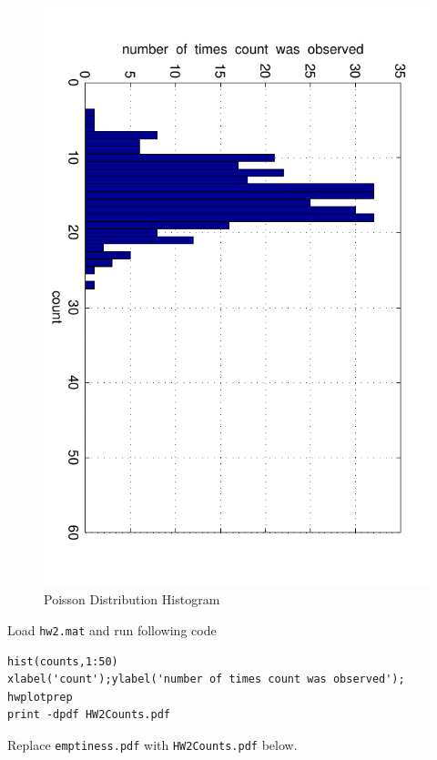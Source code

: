 \documentclass{article}
\begin{document}
{\begin{figure}[H]
\begin{center}
\includegraphics[scale=0.5, angle=90]{aPoissonExample.pdf}
\caption{Poisson Distribution Histogram}
\end{center}
\end{figure}

Load \texttt{hw2.mat} and run following code
\begin{verbatim}
hist(counts,1:50)
xlabel('count');ylabel('number of times count was observed');
hwplotprep
print -dpdf HW2Counts.pdf
\end{verbatim}

Replace \texttt{emptiness.pdf} with \texttt{HW2Counts.pdf} below.

}
\end{document}
